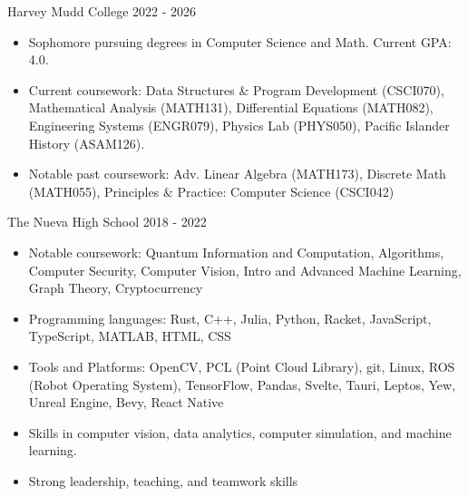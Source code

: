 \documentclass[9pt]{resume}
\begin{document}
    \begin{experiencelist}
        \experiencenocompany 
            {Harvey Mudd College}
            {2022 - 2026}
            {\begin{itemize}[noitemsep, topsep=1pt]
                \item {Sophomore pursuing degrees in Computer Science and Math. Current GPA: 4.0. }
                \item {Current coursework: Data Structures \& Program Development (CSCI070), Mathematical Analysis (MATH131), Differential Equations (MATH082), Engineering Systems (ENGR079), Physics Lab (PHYS050), Pacific Islander History (ASAM126).}
                \item {Notable past coursework: Adv. Linear Algebra (MATH173), Discrete Math (MATH055), Principles \& Practice: Computer Science (CSCI042)}
            \end{itemize}}
        \experiencenocompany
            {The Nueva High School}
            {2018 - 2022}
            {\begin{itemize}[noitemsep, topsep=1pt]
                \item Notable coursework: Quantum Information and Computation, Algorithms, Computer Security, Computer Vision, Intro and Advanced Machine Learning, Graph Theory, Cryptocurrency
            \end{itemize}}
    \end{experiencelist}
    \vspace{-0.2cm}
    \begin{itemize}[noitemsep, topsep=0pt]
        \item Programming languages: Rust, C++, Julia, Python, Racket, JavaScript, TypeScript, MATLAB, HTML, CSS
        \item Tools and Platforms: OpenCV, PCL (Point Cloud Library), git, Linux, ROS (Robot Operating System), TensorFlow, Pandas, Svelte, Tauri, Leptos, Yew, Unreal Engine, Bevy, React Native
        \item Skills in computer vision, data analytics, computer simulation, and machine learning.
        \item Strong leadership, teaching, and teamwork skills
    \end{itemize}
\end{document}
